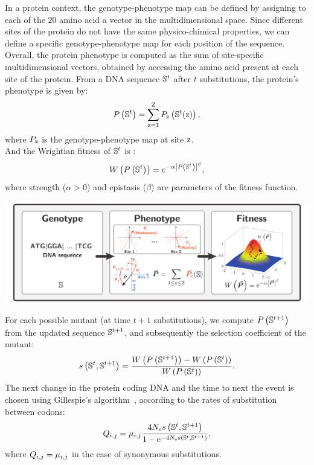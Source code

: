 \documentclass{article}
\begin{document}
	In a protein context, the genotype-phenotype map can be defined by assigning to each of the $20$ amino acid a vector in the multidimensional space.
	Since different sites of the protein do not have the same physico-chimical properties, we can define a specific genotype-phenotype map for each position of the sequence.
	Overall, the protein {phenotype} is computed as the sum of site-specific multidimensional vectors, obtained by accessing the amino acid present at each site of the protein.
	From a {DNA} sequence $\mathbb{S}^t$ after $t$ substitutions, the protein's {phenotype} is given by:
	\begin{equation}
		P\left(\mathbb{S}^{t}\right) = \sum\limits_{\text{z}=1}^{\text{Z}} P_{\text{z}} \left(\mathbb{S}^t(\text{z}) \right),
	\end{equation}
	where $P_{\text{z}}$ is the genotype-phenotype map at site $\text{z}$.\\

	And the Wrightian fitness of $\mathbb{S}^t$ is :
	\begin{equation}
		W\left( P\left(\mathbb{S}^{t}\right) \right) = e^{-\alpha \left| P\left(\mathbb{S}^{t}\right) \right|^{\beta}},
	\end{equation}
	where strength ($\alpha > 0$) and epistasis ($\beta$) are parameters of the fitness function.
	\begin{center}
		\includegraphics[width=\textwidth] {ModelSimuGeo}
	\end{center}
	For each possible mutant (at time $t+1$ substitutions), we compute $P\left(\mathbb{S}^{t+1}\right)$ from the updated sequence $\mathbb{S}^{t+1}$, and subsequently the selection coefficient of the mutant:
	\begin{equation}
		s \left( \mathbb{S}^{t},\mathbb{S}^{t+1}\right) = \dfrac{W\left( P\left(\mathbb{S}^{t+1}\right) \right) -W\left( P\left(\mathbb{S}^{t}\right) \right)}{W\left( P\left(\mathbb{S}^{t}\right) \right)}.
	\end{equation}
	The next change in the protein coding {DNA} and the time to next the event is chosen using Gillespie's algorithm~\citep{Gillespie1977}, according to the rates of {substitution} between codons:
	\begin{equation}
	{Q_{{i}, {j}}}
		= \mu_{{i}, {j}} \dfrac{4 N_{\text{e}} s \left( \mathbb{S}^{t},\mathbb{S}^{t+1}\right)}{{1 - \text{e}^{-4 N_{\text{e}} s \left( \mathbb{S}^{t},\mathbb{S}^{t+1}\right)} }},
	\end{equation}
	where ${Q_{{i}, {j}}} = \mu_{{i}, {j}}$ in the case of {synonymous} substitutions.
\end{document}
